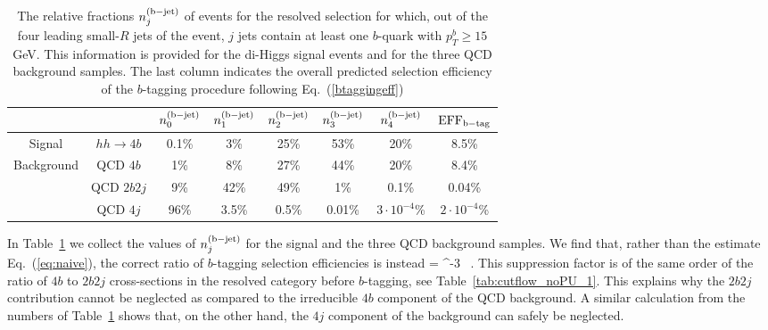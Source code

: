 \begin{table}[t]
  \centering
  \small
  \begin{tabular}{|c|c|c|c|c|c|c|c|}
    \hline
  \multicolumn{2}{|c|}{}   &  $n^{\rm (b-jet)}_0$  &  $n^{\rm (b-jet)}_1$  &  $n^{\rm (b-jet)}_2$  & $n^{\rm (b-jet)}_3$ &
    $n^{\rm (b-jet)}_4$ & ${\rm EFF}_{\rm b-tag}$ \\
    \hline
    \hline
    Signal  &  $hh\to 4b$  &   0.1\%    & 3\%     &  25\%     & 53\%     & 20\%      & 8.5\%  \\
    \hline
    \multirow{3}{*}{Background}  &  QCD $4b$  & 1\%      &  8\%    &   27\%   &  44\%     & 20\%       &  8.4\% \\
     &  QCD $2b2j$  &   9\%    & 42\%     &  49\%    & 1\%     &  0.1\%     & 0.04\%  \\
    &  QCD $4j$  &   96\%    &  3.5\%     & 0.5\%     &  0.01\%    & $3\cdot 10^{-4}$\%      &
    $2\cdot 10^{-4}$\%\\
    \hline
  \end{tabular}
  \caption{\small
    The relative fractions  $n^{\rm (b-jet)}_j$ of events for the resolved selection
    for which, out of the four leading small-$R$ jets of the
    event, $j$ jets
    contain at least one $b$-quark with $p_T^b\ge 15$ GeV.
    This information is provided
    for the di-Higgs signal events and for the three QCD background samples.
    The last column indicates the overall predicted
    selection efficiency of the $b$-tagging procedure following
    Eq.~(\ref{btaggingeff})
    \label{tab:btaggingcheck}
  }
  \end{table}

In Table~\ref{tab:btaggingcheck} we collect
the values of $n^{\rm (b-jet)}_j$ for the signal and the three QCD background samples.
%
We find that, rather than the estimate Eq.~(\ref{eq:naive}),
the correct ratio of $b$-tagging selection efficiencies is instead
\be
{}=
   ^{-3} \, .
  \ee
  This suppression factor is of the same order of the ratio of $4b$ to $2b2j$ cross-sections
  in the resolved category before $b$-tagging, see Table~\ref{tab:cutflow_noPU_1}.
    This explains why the $2b2j$ contribution cannot be neglected as compared
    to the irreducible $4b$ component of the QCD background.
    A similar calculation from the numbers of Table~\ref{tab:btaggingcheck} shows
    that, on the other hand, the $4j$ component of the background can safely
    be neglected.
    



